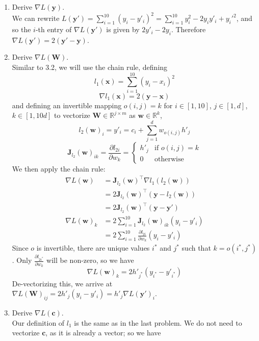 \documentclass{article}
\begin{document}
\begin{enumerate}[label=\arabic*.]
\item Derive $\nabla L(\mathbf{y})$.\\
	{\color{blue}We can rewrite $L(\mathbf{y'}) = \sum_{i=1}^{10} (y_i - y'_i)^2 = \sum_{i=1}^{10}y_i^2 - 2y_iy'_i + y_i'^{2}$, and so the $i$-th entry of $\nabla L(\mathbf{y'})$ is given by $2y'_i - 2y_i$. Therefore $\nabla L(\mathbf{y'}) = 2(\mathbf{y' - y})$.}
\item Derive $\nabla L(\mathbf{W})$.\\
	{\color{blue}Similar to 3.2, we will use the chain rule, defining
	$$l_1(\mathbf{x}) = \sum_{i=1}^{10}(y_i - x_i)^2$$
	$$\nabla l_1(\mathbf{x}) = 2(\mathbf{y - x})$$
	and defining an invertible mapping $o(i, j) = k$ for $i \in [1, 10]$, $j \in [1, d]$, $k \in [1, 10d]$ to vectorize $\mathbf{W} \in \mathbb{R}^{j \times m}$ as $\mathbf{w} \in \mathbb{R}^k$,
	$$l_2(\mathbf{w})_i = y'_i = c_i + \sum_{j=1}^d w_{o(i,j)}h'_j$$
	$$\mathbf{J}_{l_2}(\mathbf{w})_{ik} = \frac{\partial l_{2i}}{\partial w_k} = \begin{cases} h'_j & \text{if } o(i,j)=k \\ 0 & \text{otherwise}\end{cases}$$
	We then apply the chain rule:
	\begin{align*}
	\nabla L(\mathbf{w}) &= \mathbf{J}_{l_2}(\mathbf{w})^\top\nabla l_1(l_2(\mathbf{w}))\\
	&= 2\mathbf{J}_{l_2}(\mathbf{w})^\top(\mathbf{y} - l_2(\mathbf{w}))\\
	&= 2\mathbf{J}_{l_2}(\mathbf{w})^\top(\mathbf{y - y'})\\
	\nabla L(\mathbf{w})_k &= 2\sum_{i=1}^{10}\mathbf{J}_{l_2}(\mathbf{w})_{ik}(y_i - y'_i)\\
	&= 2\sum_{i=1}^{10}\frac{\partial l_{2i}}{\partial w_k}(y_i - y'_i)
	\end{align*}
	Since $o$ is invertible, there are unique values $i^*$ and $j^*$ such that $k = o(i^*, j^*)$. Only $\frac{\partial l_{2i^*}}{\partial w_{k}}$ will be non-zero, so we have
	$$\nabla L(\mathbf{w})_k = 2h'_{j^*}(y_{i^*} - y'_{i^*})$$
	De-vectorizing this, we arrive at $\nabla L(\mathbf{W})_{ij} = 2h'_j(y_i - y'_i) = h'_j\nabla L(\mathbf{y'})_i$.
	}
\item Derive $\nabla L(\mathbf{c})$.\\
	{\color{blue} Our definition of $l_1$ is the same as in the last problem. We do not need to vectorize $\mathbf{c}$, as it is already a vector; so we have
		\begin{align*}

\end{align*}}
\end{enumerate}
\end{document}
